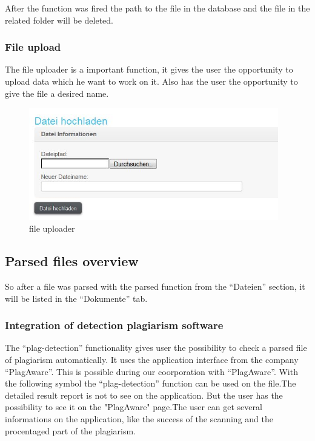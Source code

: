 After the function was fired the path to the file in the database and the file in the related folder will be deleted.

\subsubsection{File upload}

The file uploader is a important function, it gives the user the opportunity to upload data which he want to work on 
it. Also has the user the opportunity to give the file a desired name.

\begin{figure}[!ht]
  \centering
    \includegraphics[width=0.97\textwidth]{images/basic_functionalities/datei_hochladen.jpg}
  \caption{file uploader}
  \label{fig:file uploader}
\end{figure}

\subsection{Parsed files overview}\label{sec:parse-file}

So after a file was parsed with the parsed function from the \enquote{Dateien} section, it will be listed in the 
\enquote{Dokumente} tab.

\subsubsection{Integration of detection plagiarism software}

The \enquote{plag-detection} functionality gives user the possibility to check a parsed file of plagiarism automatically. 
It uses the application interface from the company \enquote{PlagAware}. This is possible during our coorporation with 
\enquote{PlagAware}.
With the following symbol the \enquote{plag-detection} function can be used on the file.The detailed result report is 
not to see on the application. But the user has the possibility to see it on the "PlagAware" page.The user can get 
several informations on the application, like the success of the scanning and the procentaged part of the plagiarism.

